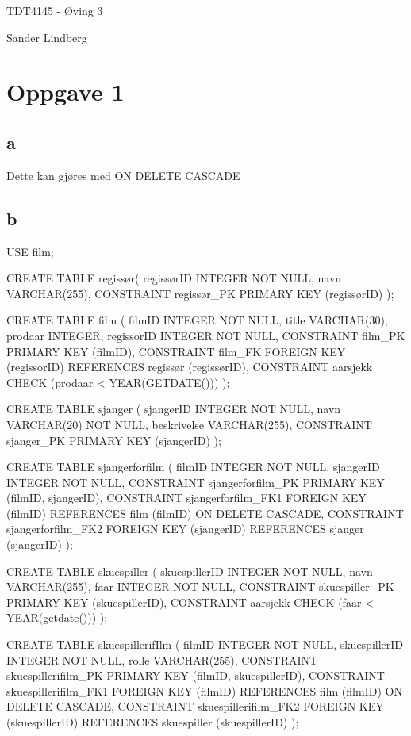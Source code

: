 \documentclass[12pt,a4paper]{article}
\begin{document}
\begin{titlepage}
    \centering
    \vspace*{\fill}

    \vspace*{0.5cm}

    \huge
    TDT4145 - Øving 3

    \vspace*{0.5cm}

    \large Sander Lindberg

    \vspace*{\fill}
    \end{titlepage}

	\newpage

	\section{Oppgave 1}
	\subsection{a}
		Dette kan gjøres med ON DELETE CASCADE
	
	\subsection{b}
		\begin{spverbatim}
USE film;

CREATE TABLE regissør(
regissørID INTEGER NOT NULL,
navn VARCHAR(255),
 CONSTRAINT regissør_PK PRIMARY KEY (regissørID)
);

CREATE TABLE film (
filmID INTEGER NOT NULL,
title VARCHAR(30),
prodaar INTEGER,
regissorID INTEGER NOT NULL,
CONSTRAINT film_PK PRIMARY KEY (filmID),
CONSTRAINT film_FK FOREIGN KEY (regissorID)
	REFERENCES regissør (regissørID),
CONSTRAINT aarsjekk CHECK (prodaar < YEAR(GETDATE()))
);

CREATE TABLE sjanger (
sjangerID INTEGER NOT NULL,
navn VARCHAR(20) NOT NULL,
beskrivelse VARCHAR(255),
CONSTRAINT sjanger_PK PRIMARY KEY (sjangerID)
);

CREATE TABLE sjangerforfilm (
filmID INTEGER NOT NULL,
sjangerID INTEGER NOT NULL,
CONSTRAINT sjangerforfilm_PK PRIMARY KEY (filmID, sjangerID),
CONSTRAINT sjangerforfilm_FK1 FOREIGN KEY (filmID) REFERENCES film (filmID) ON DELETE CASCADE,
CONSTRAINT sjangerforfilm_FK2 FOREIGN KEY (sjangerID) REFERENCES sjanger (sjangerID)
);

CREATE TABLE skuespiller (
skuespillerID INTEGER NOT NULL,
navn VARCHAR(255),
faar INTEGER NOT NULL,
CONSTRAINT skuespiller_PK PRIMARY KEY (skuespillerID),
CONSTRAINT aarsjekk CHECK (faar < YEAR(getdate()))
);

CREATE TABLE skuespillerifIlm (
filmID INTEGER NOT NULL,
skuespillerID INTEGER NOT NULL,
rolle VARCHAR(255),
CONSTRAINT skuespillerifilm_PK PRIMARY KEY (filmID, skuespillerID),
CONSTRAINT skuespillerifilm_FK1 FOREIGN KEY (filmID) REFERENCES film (filmID) ON DELETE CASCADE,
CONSTRAINT skuespillerifilm_FK2 FOREIGN KEY (skuespillerID) REFERENCES skuespiller (skuespillerID)
);
	\end{spverbatim}
	
\end{document}
